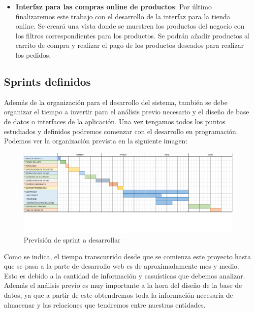 \begin{itemize}
\begin{itemize}
                \item \textbf{Interfaz para las compras online de productos}: Por último finalizaremos este trabajo con
                el desarrollo de la interfaz para la tienda online. Se creará una vista donde se muestren los productos
                del negocio con los filtros correspondientes para los productos. Se podrán añadir productos al carrito
                de compra y realizar el pago de los productos deseados para realizar los pedidos.

            \end{itemize}
\end{itemize}
\subsection{Sprints definidos}

Además de la organización para el desarrollo del sistema, también se debe organizar el tiempo a invertir para el análisis previo necesario y el diseño de base de datos o interfaces de la aplicación. Una vez tengamos todos los puntos estudiados y definidos podremos comenzar con el desarrollo en programación. Podemos ver la organización prevista en la siguiente imagen:


\begin{figure}[H]
  \centering
  \includegraphics[scale=0.27]{images/Sprint_Prevision.png}
  \caption{Previsión de sprint a desarrollar}
  \label{}
\end{figure}

Como se indica, el tiempo transcurrido desde que se comienza este proyecto hasta que se pasa a la parte de desarrollo web es de aproximadamente mes y medio. Esto es debido a la cantidad de información y casuísticas que debemos analizar. Además el análisis previo es muy importante a la hora del diseño de la base de datos, ya que a partir de este obtendremos toda la información necesaria de almacenar y las relaciones que tendremos entre nuestras entidades.

